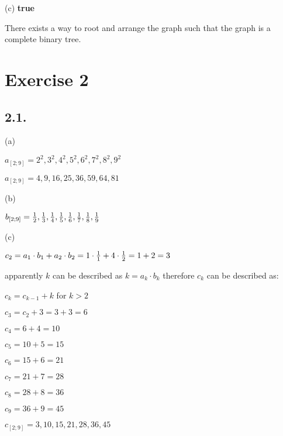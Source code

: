 \documentclass[a4paper,11pt]{article}
\begin{document}
\noindent (c) \textbf{true}

There exists a way to root and arrange the graph such that the graph is a complete binary tree.

\begin{center}
\end{center}

\newpage
\section*{Exercise 2}

\subsection*{2.1.}
(a)

$a_{[2;9]} = 2^2, 3^2, 4^2, 5^2, 6^2, 7^2, 8^2, 9^2$

$a_{[2;9]} = 4,9,16,25,36,59,64,81$

\noindent (b)

$b_{[2;9]} = {1 \over 2}, {1 \over 3}, {1 \over 4}, {1 \over 5}, {1 \over 6}, {1 \over 7}, {1 \over 8}, {1 \over 9}$

\noindent (c)

$c_2 = a_1 \cdot b_1 + a_2 \cdot b_2 = 1 \cdot {1 \over 1} + 4 \cdot {1 \over 2} = 1 + 2 = 3$

apparently $k$ can be described as $k = a_k \cdot b_k$ therefore $c_k$ can be described as:

$c_k = c_{k-1} + k$ for $k > 2$

$c_3 = c_2 + 3 = 3 + 3 = 6$

$c_4 = 6 + 4 = 10$

$c_5 = 10 + 5 = 15$

$c_6 = 15 + 6 = 21$

$c_7 = 21 + 7 = 28$

$c_8 = 28 + 8 = 36$

$c_9 = 36 + 9 = 45$

$c_{[2;9]} = 3,10,15,21,28,36,45$
\end{document}
